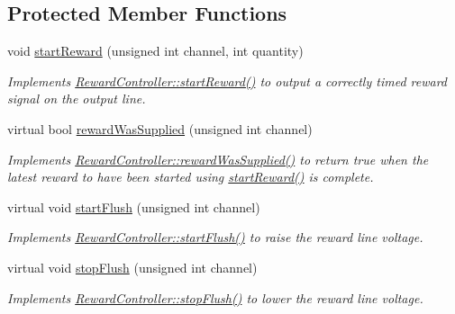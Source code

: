 \subsection*{Protected Member Functions}
\begin{DoxyCompactItemize}
\item 
void \hyperlink{class_picto_1_1_legacy_system_x_p_reward_controller_a144f530dcb20520deb10666510614e14}{start\-Reward} (unsigned int channel, int quantity)
\begin{DoxyCompactList}\small\item\em Implements \hyperlink{class_picto_1_1_reward_controller_a3e09bdba141632e89472bef42dc1e132}{Reward\-Controller\-::start\-Reward()} to output a correctly timed reward signal on the output line. \end{DoxyCompactList}\item 
virtual bool \hyperlink{class_picto_1_1_legacy_system_x_p_reward_controller_acedbc12ba8ef59c623f957dcec8872a8}{reward\-Was\-Supplied} (unsigned int channel)
\begin{DoxyCompactList}\small\item\em Implements \hyperlink{class_picto_1_1_reward_controller_a213ce91b8ef9019786e96e601d9641b9}{Reward\-Controller\-::reward\-Was\-Supplied()} to return true when the latest reward to have been started using \hyperlink{class_picto_1_1_legacy_system_x_p_reward_controller_a144f530dcb20520deb10666510614e14}{start\-Reward()} is complete. \end{DoxyCompactList}\item 
virtual void \hyperlink{class_picto_1_1_legacy_system_x_p_reward_controller_a5a58e7d83861950be8be54e24d13b07e}{start\-Flush} (unsigned int channel)
\begin{DoxyCompactList}\small\item\em Implements \hyperlink{class_picto_1_1_reward_controller_aaf880507edaa44288cd5b17bdb71f079}{Reward\-Controller\-::start\-Flush()} to raise the reward line voltage. \end{DoxyCompactList}\item 
virtual void \hyperlink{class_picto_1_1_legacy_system_x_p_reward_controller_a00f99b4c7d166d2c51d4c1598cc0a0c1}{stop\-Flush} (unsigned int channel)
\begin{DoxyCompactList}\small\item\em Implements \hyperlink{class_picto_1_1_reward_controller_a5a14b4f103def1711b485cc05f4c53bb}{Reward\-Controller\-::stop\-Flush()} to lower the reward line voltage. \end{DoxyCompactList}\end{DoxyCompactItemize}
